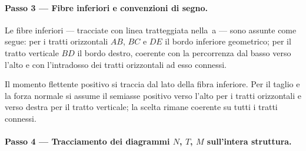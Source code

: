 \paragraph{Passo 3 --- Fibre inferiori e convenzioni di segno.}

Le fibre inferiori --- tracciate con linea
tratteggiata nella \,a
--- sono assunte come segue: per i tratti
orizzontali $AB$, $BC$ e $DE$ il bordo inferiore
geometrico; per il tratto verticale $BD$ il bordo
destro, coerente con la percorrenza dal basso
verso l'alto e con l'intradosso dei tratti
orizzontali ad esso connessi.

Il momento flettente positivo si traccia dal
lato della fibra inferiore. Per il taglio e
la forza normale si assume il semiasse positivo
verso l'alto per i tratti orizzontali e verso
destra per il tratto verticale; la scelta
rimane coerente su tutti i tratti connessi.

\paragraph{Passo 4 --- Tracciamento dei diagrammi	$N$, $T$, $M$ sull'intera struttura.}

